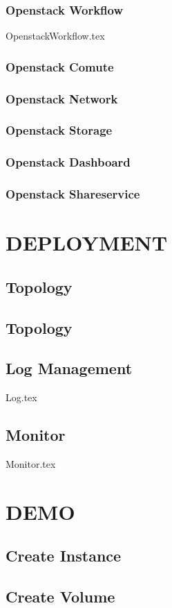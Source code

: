 \documentclass[12pt, a4paper,titlepage, fleqn]{report}%
\begin{document}
		\subsection{Openstack Workflow}
			{OpenstackWorkflow.tex}
		\subsection{Openstack Comute}
		\subsection{Openstack Network}
		\subsection{Openstack Storage}
		\subsection{Openstack Dashboard}
		\subsection{Openstack Shareservice}
\chapter{DEPLOYMENT}

	\section{Topology}
	\section{Topology}
	\section{Log Management}
		{Log.tex}
	\section{Monitor}
		{Monitor.tex}
\chapter{DEMO}
	\section{Create Instance}
	\section{Create Volume}
\end{document}
